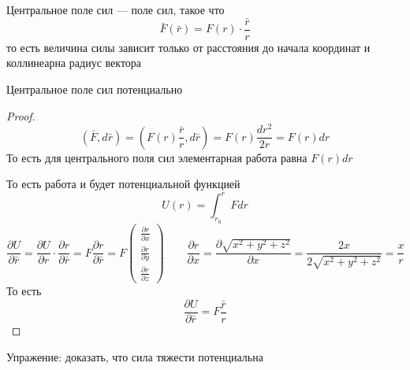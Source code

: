\documentclass[crop=false]{standalone}
\begin{document}
\Def Центральное поле сил — поле сил, такое что
\[\bar F(\bar r) = F(r) \cdot \frac{\bar r}{r}\]
то есть величина силы зависит только от расстояния до начала координат и коллинеарна радиус вектора

\noindent \keypoint Центральное поле сил потенциально
\begin{proof}
    \[(\bar F, d \bar r) = \left(F(r) \frac{\bar r}{r}, d \bar r\right) = F(r) \frac{d r^2}{2 r} = F(r) d r\]
    То есть для центрального поля сил элементарная работа равна $F(r) dr$
    
    То есть работа и будет потенциальной функцией
    \[U(r) = \int_{r_0}^r F d r\]
    \[\frac{\partial U}{\partial \bar r} = \frac{\partial U}{\partial r} \cdot \frac{\partial r}{\partial \bar r} = F \frac{\partial r}{\partial \bar r} = F \begin{pmatrix}
        \frac{\partial r}{\partial x} \\ \frac{\partial r}{\partial y} \\ \frac{\partial r}{\partial z}
    \end{pmatrix} \qquad \frac{\partial r}{\partial x} = \frac{\partial \sqrt{x^2 + y^2 + z^2}}{\partial x} = \frac{2 x}{2 \sqrt{x^2 + y^2 + z^2}} = \frac{x}{r}\]
    То есть
    \[\frac{\partial U}{\partial \bar r} = F \frac{\bar r}{r}\]
\end{proof}
Упражение: доказать, что сила тяжести потенциальна
\end{document}
